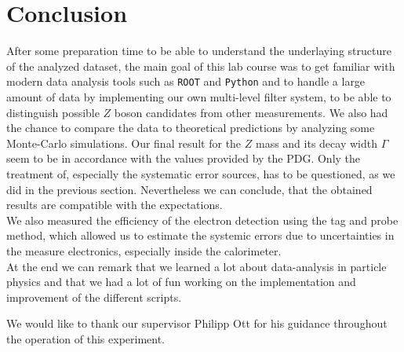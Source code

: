 \documentclass[twocolumn,
			   showpacs,%
               nofootinbib,
               aps,%
               prd,
               notitlepage,
               showkeys,
               10pt]{revtex4-1}
\begin{document}
\section{Conclusion}
After some preparation time to be able to understand the underlaying structure of the analyzed dataset, the main goal of this lab course was to get familiar with modern data analysis tools such as \verb|ROOT| and \verb|Python| and to handle a large amount of data by implementing our own multi-level filter system, to be able to distinguish possible $Z$ boson candidates from other measurements. We also had the chance to compare the data to theoretical predictions by analyzing some Monte-Carlo simulations. Our final result for the $Z$ mass and its decay width $\Gamma$ seem to be in accordance with the values provided by the PDG. Only the treatment of, especially the systematic error sources,  has to  be questioned, as we did in the previous section. Nevertheless we can conclude, that the obtained results are compatible with the expectations.\\
We also measured the efficiency of the electron detection using the tag and probe method, which allowed us to estimate the systemic errors due to uncertainties in the measure electronics, especially inside the calorimeter.\\

At the end we can remark that we learned a lot about data-analysis in particle physics and that we had a lot of fun working on the implementation and improvement of the different scripts.

 
\begin{acknowledgments}
We would like to thank our supervisor Philipp Ott for his guidance throughout the operation of this experiment.
\end{acknowledgments}



\nocite{*}
\end{document}
